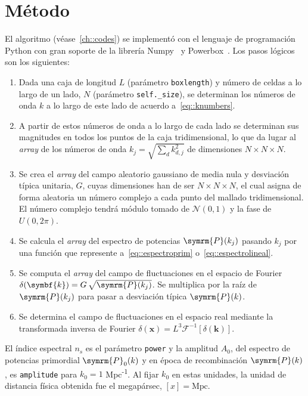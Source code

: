 \section{Método}\label{sec::metodo}
El algoritmo (véase~\autoref{ch::codes}) se implementó con el lenguaje de programación Python con gran soporte de la librería Numpy~\cite{harris2020array} y Powerbox~\cite{Murray2018}. Los pasos lógicos son los siguientes:
\begin{enumerate}
    \item Dada una caja de longitud \(L\) (parámetro \texttt{boxlength}) y número de celdas a lo largo de un lado, \(N\) (parámetro \texttt{self.\_size}), se determinan los números de onda \(k\) a lo largo de este lado de acuerdo a~\eqref{eq::knumbers}.
    \item A partir de estos números de onda a lo largo de cada lado se determinan sus magnitudes en todos los puntos de la caja tridimensional, lo que da lugar al \textit{array} de los números de onda \(k_j=\sqrt{\sum_d k^2_{d,j}}\) de dimensiones \(N\times N\times N\).
    \item Se crea el \textit{array} del campo aleatorio gaussiano de media nula y desviación típica unitaria, \(G\), cuyas dimensiones han de ser \(N\times N\times N\), el cual asigna de forma aleatoria un número complejo a cada punto del mallado tridimensional. El número complejo tendrá módulo tomado de \(\mathcal{N}(0,1)\) y la fase de \(U(0,2\pi)\).
    \item Se calcula el \textit{array} del espectro de potencias \(\symrm{P}(k_j)\) pasando \(k_j\) por una función que represente a~\eqref{eq::espectroprim} o~\eqref{eq::espectrolineal}.
    \item Se computa el \textit{array} del campo de fluctuaciones en el espacio de Fourier \(\delta(\symbf{k})=G\,\sqrt{\symrm{P}(k_j)}\). Se multiplica por la raíz de \(\symrm{P}(k_j)\) para pasar a desviación típica \(\symrm{P}(k)\).
    \item Se determina el campo de fluctuaciones en el espacio real mediante la transformada inversa de Fourier \(\delta(\symbf{x})=L^3\mathcal{F}^{-1}\left[\delta(\symbf{k})\right]\).
\end{enumerate}
El índice espectral \(n_s\) es el parámetro \texttt{power} y la amplitud \(A_0\), del espectro de potencias primordial \(\symrm{P}_0(k)\) y en época de recombinación \(\symrm{P}(k)\), es \texttt{amplitude} para \(k_0=1\) Mpc\textsuperscript{-1}. Al fijar \(k_0\) en estas unidades, la unidad de distancia física obtenida fue el megapársec, \([x]=\text{Mpc}\).


